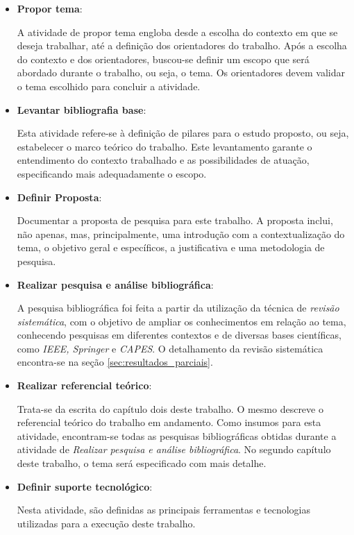 \begin{itemize}
	\item \textbf{Propor tema}:

		A atividade de propor tema engloba desde a escolha do contexto em que se deseja trabalhar, até a definição dos orientadores do trabalho. Após a escolha do contexto e dos orientadores, buscou-se definir um escopo que será abordado durante o trabalho, ou seja, o tema. Os orientadores devem validar o tema escolhido para concluir a atividade.

	\item \textbf{Levantar bibliografia base}:

		Esta atividade refere-se à definição de pilares para o estudo proposto, ou seja, estabelecer o marco teórico do trabalho. Este levantamento garante o entendimento do contexto trabalhado e as possibilidades de atuação, especificando mais adequadamente o escopo.

	\item \textbf{Definir Proposta}:

		Documentar a proposta de pesquisa para este trabalho. A proposta inclui, não apenas, mas, principalmente, uma introdução com a contextualização do tema, o objetivo geral e específicos, a justificativa e uma metodologia de pesquisa.

	\item \textbf{Realizar pesquisa e análise bibliográfica}:

		A pesquisa bibliográfica foi feita a partir da utilização da técnica de \textit{revisão sistemática}, com o objetivo de ampliar os conhecimentos em relação ao tema, conhecendo pesquisas em diferentes contextos e de diversas bases científicas, como \textit{IEEE, Springer} e \textit{CAPES}. O detalhamento da revisão sistemática encontra-se na seção \ref{sec:resultados_parciais}.

	\item \textbf{Realizar referencial teórico}:

		Trata-se da escrita do capítulo dois deste trabalho. O mesmo descreve o referencial teórico do trabalho em andamento. Como insumos para esta atividade, encontram-se todas as pesquisas bibliográficas obtidas durante a atividade de \textit{Realizar pesquisa e análise bibliográfica}. No segundo capítulo deste trabalho, o tema será especificado com mais detalhe.

	\item \textbf{Definir suporte tecnológico}:

		Nesta atividade, são definidas as principais ferramentas e tecnologias utilizadas para a execução deste trabalho. 


\end{itemize}
